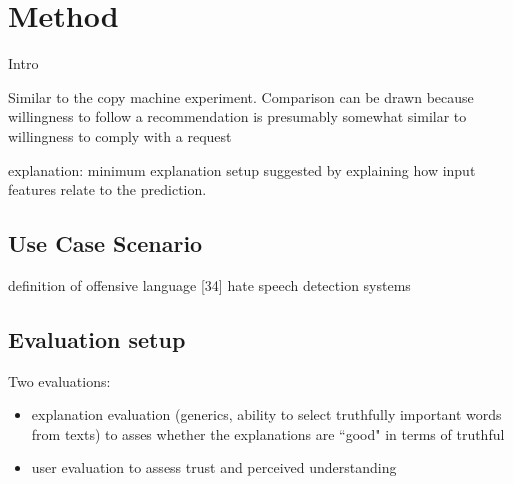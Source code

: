 \section{Method}
Intro

Similar to the copy machine experiment. Comparison can be drawn because willingness to follow a recommendation is presumably somewhat similar to willingness to comply with a request 

explanation: minimum explanation setup suggested by \cite{goodman16eu} explaining how input features relate to the prediction.

\subsection{Use Case Scenario}
definition of offensive language [34] \newline
hate speech detection systems \newline

\subsection{Evaluation setup}

Two evaluations: 
\begin{itemize}
	\item explanation evaluation (generics, ability to select truthfully important words from texts) to asses whether the explanations are ``good" in terms of truthful
	\item user evaluation to assess trust and perceived understanding
\end{itemize}







